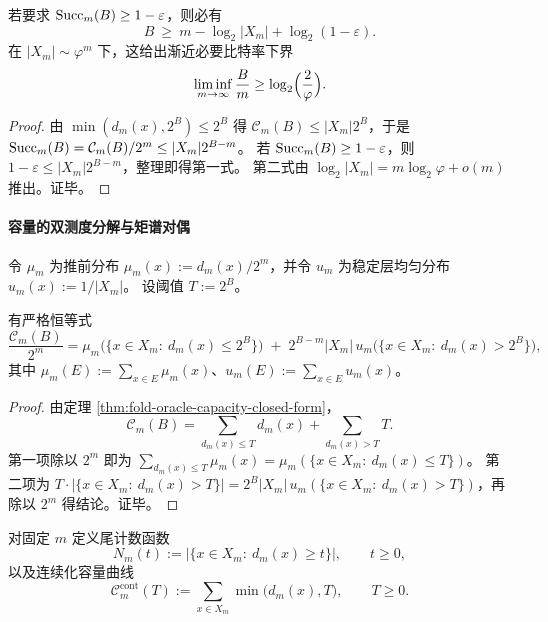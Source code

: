 \begin{corollary}\label{cor:fold-oracle-pigeonhole-bound}
若要求 \({\rm Succ}_m(B)\ge 1-\varepsilon\)，则必有
\[
B\ \ge\ m-\log_2|X_m|+\log_2(1-\varepsilon).
\]
在 \(|X_m|\sim \varphi^m\) 下，这给出渐近必要比特率下界
\[
\liminf_{m\to\infty}\frac{B}{m}\ge \log_2\Bigl(\frac{2}{\varphi}\Bigr).
\]
\end{corollary}

\begin{proof}
由 \(\min(d_m(x),2^B)\le 2^B\) 得 \(\mathcal{C}_m(B)\le |X_m|2^B\)，于是
\(
{\rm Succ}_m(B)=\mathcal{C}_m(B)/2^m\le |X_m|2^{B-m}
\)。
若 \({\rm Succ}_m(B)\ge 1-\varepsilon\)，则 \(1-\varepsilon\le |X_m|2^{B-m}\)，整理即得第一式。
第二式由 \(\log_2|X_m|=m\log_2\varphi+o(m)\) 推出。证毕。
\end{proof}

\paragraph{容量的双测度分解与矩谱对偶}
令 \(\mu_m\) 为推前分布 \(\mu_m(x):=d_m(x)/2^m\)，并令 \(u_m\) 为稳定层均匀分布 \(u_m(x):=1/|X_m|\)。
设阈值 \(T:=2^B\)。

\begin{proposition}[容量的双测度恒等式]\label{prop:fold-oracle-capacity-bimeasure-identity}
有严格恒等式
\[
\frac{\mathcal{C}_m(B)}{2^m}
=\mu_m\bigl(\{x\in X_m:\ d_m(x)\le 2^B\}\bigr)
\;+\;2^{B-m}|X_m|\,u_m\bigl(\{x\in X_m:\ d_m(x)>2^B\}\bigr),
\]
其中 \(\mu_m(E):=\sum_{x\in E}\mu_m(x)\)、\(u_m(E):=\sum_{x\in E}u_m(x)\)。
\end{proposition}

\begin{proof}
由定理 \ref{thm:fold-oracle-capacity-closed-form}，
\[
\mathcal{C}_m(B)=\sum_{d_m(x)\le T} d_m(x)+\sum_{d_m(x)>T}T.
\]
第一项除以 \(2^m\) 即为 \(\sum_{d_m(x)\le T}\mu_m(x)=\mu_m(\{x\in X_m:\ d_m(x)\le T\})\)。
第二项为 \(T\cdot|\{x\in X_m:\ d_m(x)>T\}|=2^B|X_m|\,u_m(\{x\in X_m:\ d_m(x)>T\})\)，再除以 \(2^m\) 得结论。证毕。
\end{proof}

\begin{definition}[尾计数函数与连续容量曲线]\label{def:fold-capacity-tail}
对固定 \(m\) 定义尾计数函数
\[
N_m(t):=\bigl|\{x\in X_m:\ d_m(x)\ge t\}\bigr|,\qquad t\ge 0,
\]
以及连续化容量曲线
\[
\mathcal{C}_m^{\mathrm{cont}}(T):=\sum_{x\in X_m}\min\bigl(d_m(x),T\bigr),\qquad T\ge 0.
\]
\end{definition}

